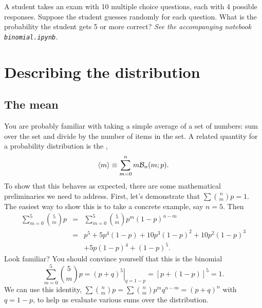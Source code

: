 \begin{exercisebox}
A student takes an exam with 10 multiple choice questions, each with 4 possible responses.  Suppose the student guesses randomly for each question.  What is the probability the student gets 5 or more correct? \emph{See the accompanying notebook \texttt{binomial.ipynb}.}
\end{exercisebox}

\section{Describing the distribution}
\subsection{The mean}

You are probably familiar with taking a simple average of a set of numbers: sum over the set and divide by the number of items in the set.  A related quantity for a probability distribution is the ,
\begin{equation}\label{e.mean}
 \left\langle m\right\rangle \equiv \sum_{m=0}^{n} m\mathcal{B}_{n}(m;p).
\end{equation}
To show that this behaves as expected, there are some mathematical preliminaries we need to address.  First, let's demonstrate that $\sum\binom{n}{m}{p} = 1$.  The easiest way to show this is to take a concrete example, say $n=5$.  Then
\begin{eqnarray*} \sum_{m=0}^{5}\binom{5}{m}{p} &=& \sum_{m=0}^{5}{5\choose m}p^{m}(1-p)^{n-m}\\
	&=&	p^{5}+5p^{4}(1-p)+10p^{3}(1-p)^{2}+10p^{2}(1-p)^{3}\\
	&& +5p(1-p)^{4}+(1-p)^{5}.
\end{eqnarray*}
Look familiar?  You should convince yourself that this is the binomial
\[ \sum_{m=0}^{5}\binom{5}{m}{p} = \left.\left(p+q\right)^{5}\right|_{q=1-p}
	= \left[p + \left(1-p\right)\right]^{5} = 1. \]
We can use this identity, $\sum\binom{n}{m}{p}=\sum{n\choose m}p^{m}q^{n-m} = (p+q)^{n}$ with $q=1-p$, to help us evaluate various sums over the distribution.

